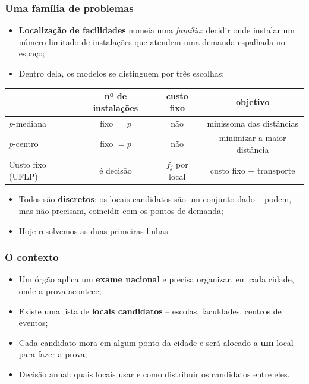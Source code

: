 \documentclass[fleqn]{beamer}
\begin{document}
\begin{frame}
	\frametitle{Uma família de problemas}
	\begin{itemize}
		\item \textbf{Localização de facilidades} nomeia uma
			\emph{família}: decidir onde instalar um número limitado de
			instalações que atendem uma demanda espalhada no espaço;
		\item Dentro dela, os modelos se distinguem por três escolhas:
	\end{itemize}
	\begin{center}
	\footnotesize
	\begin{tabular}{lccc}
		\toprule
		 & nº de instalações & custo fixo & objetivo \\
		\midrule
		$p$-mediana        & fixo $= p$ & não          & minissoma das distâncias \\
		$p$-centro         & fixo $= p$ & não          & minimizar a maior distância \\
		Custo fixo (UFLP)  & é decisão  & $f_j$ por local & custo fixo $+$ transporte \\
		\bottomrule
	\end{tabular}
	\end{center}
	\begin{itemize}
		\item Todos são \textbf{discretos}: os locais candidatos são um
			conjunto dado -- podem, mas não precisam, coincidir com os
			pontos de demanda;
		\item Hoje resolvemos as duas primeiras linhas.
	\end{itemize}
\end{frame}

\begin{frame}
	\frametitle{O contexto}
	\begin{itemize}
		\item Um órgão aplica um \textbf{exame nacional} e precisa
			organizar, em cada cidade, onde a prova acontece;
		\item Existe uma lista de \textbf{locais candidatos} -- escolas,
			faculdades, centros de eventos;
		\item Cada candidato mora em algum ponto da cidade e será alocado
			a \textbf{um} local para fazer a prova;
		\item Decisão anual: quais locais usar e como distribuir os
			candidatos entre eles.
	\end{itemize}
\end{frame}
\end{document}
